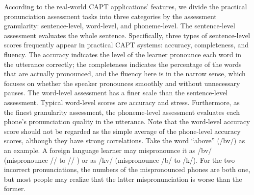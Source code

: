\documentclass[a4paper]{article}
\begin{document}
According to the real-world CAPT applications' features, we divide the practical pronunciation assessment tasks into three categories by the assessment granularity: sentence-level, word-level, and phoneme-level.
The sentence-level assessment evaluates the whole sentence.
Specifically, three types of sentence-level scores frequently appear in practical CAPT systems: accuracy, completeness, and fluency.
The accuracy indicates the level of the learner pronounce each word in the utterance correctly; the completeness indicates the percentage of the words that are actually pronounced, and the fluency here is in the narrow sense\cite{lennon2000lexical}, which focuses on whether the speaker pronounces smoothly and without unnecessary pauses.
The word-level assessment has a finer scale than the sentence-level assessment. Typical word-level scores are accuracy and stress. Furthermore, as the finest granularity assessment, the phoneme-level assessment evaluates each phone's pronunciation quality in the utterance.
Note that the word-level accuracy score should not be regarded as the simple average of the phone-level accuracy scores, although they have strong correlations. Take the word ``above'' (/\textschwa \textprimstress b\textturnv v/) as an example. A foreign language learner may mispronounce it as /\textschwa \textprimstress b\textscripta v/ (mispronounce /\textturnv/ to /\textscripta/ ) or as /\textschwa \textprimstress k\textturnv v/ (mispronounce /b/ to /k/). For the two incorrect pronunciations, the numbers of the mispronounced phones are both one, but most people may realize that the latter mispronunciation is worse than the former.
\end{document}
